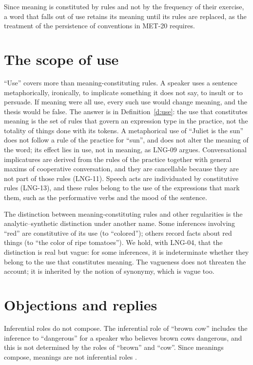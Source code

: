 \documentclass{situationist-preprint}
\begin{document}
Since meaning is constituted by rules and not by the frequency of their exercise, a word that falls out of use retains its meaning until its rules are replaced, as the treatment of the persistence of conventions in MET-20 requires.

\section{The scope of use}\label{s:scope}

\enquote{Use} covers more than meaning-constituting rules. A speaker uses a sentence metaphorically, ironically, to implicate something it does not say, to insult or to persuade. If meaning were all use, every such use would change meaning, and the thesis would be false. The answer is in Definition~\ref{d:use}: the use that constitutes meaning is the set of rules that govern an expression type in the practice, not the totality of things done with its tokens. A metaphorical use of \enquote{Juliet is the sun} does not follow a rule of the practice for \enquote{sun}, and does not alter the meaning of the word; its effect lies in use, not in meaning, as LNG-09 argues. Conversational implicatures are derived from the rules of the practice together with general maxims of cooperative conversation, and they are cancellable because they are not part of those rules (LNG-11). Speech acts are individuated by constitutive rules (LNG-13), and these rules belong to the use of the expressions that mark them, such as the performative verbs and the mood of the sentence.

The distinction between meaning-constituting rules and other regularities is the analytic--synthetic distinction under another name. Some inferences involving \enquote{red} are constitutive of its use (to \enquote{colored}); others record facts about red things (to \enquote{the color of ripe tomatoes}). We hold, with LNG-04, that the distinction is real but vague: for some inferences, it is indeterminate whether they belong to the use that constitutes meaning. The vagueness does not threaten the account; it is inherited by the notion of synonymy, which is vague too.

\section{Objections and replies}\label{s:objections}

\begin{objection}[Compositionality]
Inferential roles do not compose. The inferential role of \enquote{brown cow} includes the inference to \enquote{dangerous} for a speaker who believes brown cows dangerous, and this is not determined by the roles of \enquote{brown} and \enquote{cow}. Since meanings compose, meanings are not inferential roles \citep{FodorLepore1991}.
\end{objection}
\end{document}

